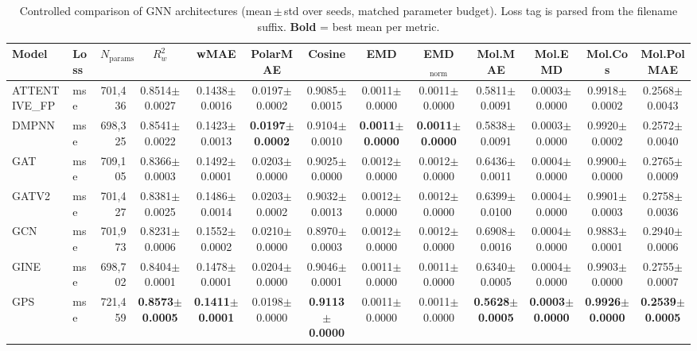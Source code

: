 \begin{table}[ht]
\centering
\caption{Controlled comparison of GNN architectures (mean\,$\pm$\,std over seeds, matched parameter budget). Loss tag is parsed from the filename suffix. \textbf{Bold} = best mean per metric.}
\label{tab:benchmark}
\small
\begin{tabular}{l l r c c c c c c c c c c }
\toprule
Model & Loss & $N_{\text{params}}$ & $R^2_w$ & wMAE & PolarMAE & Cosine & EMD & EMD$_\mathrm{norm}$ & Mol.MAE & Mol.EMD & Mol.Cos & Mol.PolMAE \\
\midrule
ATTENTIVE_FP & mse & 701,436 & 0.8514$\pm$0.0027 & 0.1438$\pm$0.0016 & 0.0197$\pm$0.0002 & 0.9085$\pm$0.0015 & 0.0011$\pm$0.0000 & 0.0011$\pm$0.0000 & 0.5811$\pm$0.0091 & 0.0003$\pm$0.0000 & 0.9918$\pm$0.0002 & 0.2568$\pm$0.0043 \\
DMPNN & mse & 698,325 & 0.8541$\pm$0.0022 & 0.1423$\pm$0.0013 & \textbf{0.0197$\pm$0.0002} & 0.9104$\pm$0.0010 & \textbf{0.0011$\pm$0.0000} & \textbf{0.0011$\pm$0.0000} & 0.5838$\pm$0.0091 & 0.0003$\pm$0.0000 & 0.9920$\pm$0.0002 & 0.2572$\pm$0.0040 \\
GAT & mse & 709,105 & 0.8366$\pm$0.0003 & 0.1492$\pm$0.0001 & 0.0203$\pm$0.0000 & 0.9025$\pm$0.0000 & 0.0012$\pm$0.0000 & 0.0012$\pm$0.0000 & 0.6436$\pm$0.0011 & 0.0004$\pm$0.0000 & 0.9900$\pm$0.0000 & 0.2765$\pm$0.0009 \\
GATV2 & mse & 701,427 & 0.8381$\pm$0.0025 & 0.1486$\pm$0.0014 & 0.0203$\pm$0.0002 & 0.9032$\pm$0.0013 & 0.0012$\pm$0.0000 & 0.0012$\pm$0.0000 & 0.6399$\pm$0.0100 & 0.0004$\pm$0.0000 & 0.9901$\pm$0.0003 & 0.2758$\pm$0.0036 \\
GCN & mse & 701,973 & 0.8231$\pm$0.0006 & 0.1552$\pm$0.0002 & 0.0210$\pm$0.0000 & 0.8970$\pm$0.0003 & 0.0012$\pm$0.0000 & 0.0012$\pm$0.0000 & 0.6908$\pm$0.0016 & 0.0004$\pm$0.0000 & 0.9883$\pm$0.0001 & 0.2940$\pm$0.0006 \\
GINE & mse & 698,702 & 0.8404$\pm$0.0001 & 0.1478$\pm$0.0001 & 0.0204$\pm$0.0000 & 0.9046$\pm$0.0001 & 0.0011$\pm$0.0000 & 0.0011$\pm$0.0000 & 0.6340$\pm$0.0005 & 0.0004$\pm$0.0000 & 0.9903$\pm$0.0000 & 0.2755$\pm$0.0007 \\
GPS & mse & 721,459 & \textbf{0.8573$\pm$0.0005} & \textbf{0.1411$\pm$0.0001} & 0.0198$\pm$0.0000 & \textbf{0.9113$\pm$0.0000} & 0.0011$\pm$0.0000 & 0.0011$\pm$0.0000 & \textbf{0.5628$\pm$0.0005} & \textbf{0.0003$\pm$0.0000} & \textbf{0.9926$\pm$0.0000} & \textbf{0.2539$\pm$0.0005} \\
\bottomrule
\end{tabular}
\end{table}
